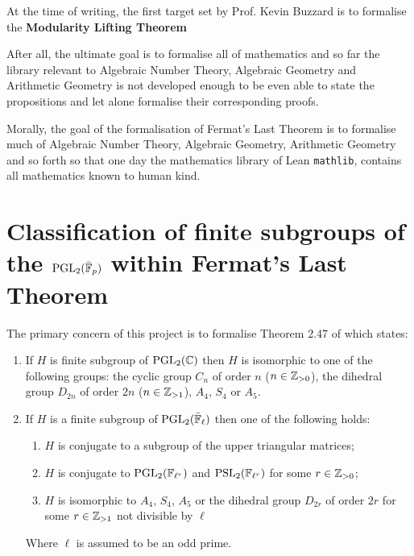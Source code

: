 At the time of writing, the first target set by Prof. Kevin Buzzard is to formalise the \textbf{Modularity Lifting Theorem}



After all, the ultimate goal is to formalise all of mathematics and so far the library relevant to Algebraic Number Theory, Algebraic Geometry and Arithmetic Geometry is not developed enough
to be even able to state the propositions and let alone formalise their corresponding proofs.

Morally, the goal of the formalisation of Fermat's Last Theorem is to formalise much of Algebraic Number Theory, Algebraic Geometry, Arithmetic Geometry and so forth so that one day
the mathematics library of Lean \texttt{mathlib}, contains all mathematics known to human kind.



\section{Classification of finite subgroups of the $\operatorname{PGL}_2(\bar{\mathbb{F}}_p)$ within Fermat's Last Theorem}

The primary concern of this project is to formalise Theorem 2.47 of \cite{dtt} which states:

\begin{enumerate}
    \item If $H$ is finite subgroup of $\operatorname{PGL}_2(\mathbb{C})$ then $H$ is isomorphic to one of the following groups: the cyclic group $C_n$ of order $n$ ($n \in \mathbb{Z}_{>0}$), the dihedral group $D_{2n}$ of order $2n$ ($n \in \mathbb{Z}_{>1}$), $A_4$, $S_4$ or $A_5$.
\item If $H$ is a finite subgroup of $\operatorname{PGL}_2(\bar{\mathbb{F}}_\ell)$ then one of the following holds:
\begin{enumerate}
    \item $H$ is conjugate to a subgroup of the upper triangular matrices;
    \item $H$ is conjugate to $\operatorname{PGL}_2(\mathbb{F}_{\ell^r})$ and $\operatorname{PSL}_2(\mathbb{F}_{\ell^{r}})$ for some $r \in \mathbb{Z}_{>0}$;
    \item $H$ is isomorphic to $A_4$, $S_4$, $A_5$ or the dihedral group $D_{2r}$ of order $2r$ for some $r \in \mathbb{Z}_{>1}$ not divisible by $\ell$

\end{enumerate}
    Where $\ell$ is assumed to be an odd prime.
\end{enumerate}

